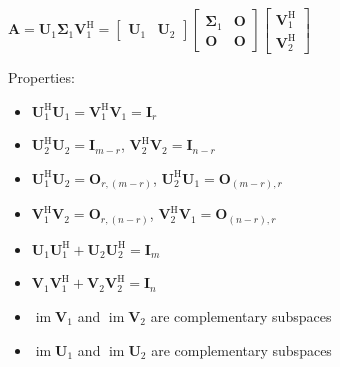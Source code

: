 \documentclass[english]{latex4ei/latex4ei_sheet}
\begin{document}
\begin{sectionbox}
  \begin{emphbox}
    $\boldsymbol{A}=\boldsymbol{U}_{1} \boldsymbol{\Sigma}_{1} \boldsymbol{V}_{1}^{\mathrm{H}}=\left[\begin{array}{ll}
      \boldsymbol{U}_{1} & \boldsymbol{U}_{2}
      \end{array}\right]\left[\begin{array}{cc}
      \boldsymbol{\Sigma}_{1} & \mathbf{O} \\
      \mathbf{O} & \mathbf{O}
      \end{array}\right]\left[\begin{array}{c}
      \boldsymbol{V}_{1}^{\mathrm{H}} \\
      \boldsymbol{V}_{2}^{\mathrm{H}}
      \end{array}\right]$
  \end{emphbox}
  Properties:
  \begin{itemize}
    \item $\boldsymbol{U}_{1}^{\mathrm{H}} \boldsymbol{U}_{1}=\boldsymbol{V}_{1}^{\mathrm{H}} \boldsymbol{V}_{1}=\mathbf{I}_{r}$\\
    \item $\boldsymbol{U}_{2}^{\mathrm{H}} \boldsymbol{U}_{2}=\mathbf{I}_{m-r}$, $\mathbf{V}_{2}^{\mathrm{H}} \mathbf{V}_{2}=\mathbf{I}_{n-r}$\\
    \item $\boldsymbol{U}_{1}^{\mathrm{H}} \boldsymbol{U}_{2}=\mathbf{O}_{r,(m-r)}$, $\boldsymbol{U}_{2}^{\mathrm{H}} \boldsymbol{U}_{1}=\mathbf{O}_{(m-r), r}$\\
    \item $\boldsymbol{V}_{1}^{\mathrm{H}} \boldsymbol{V}_{2}=\mathbf{O}_{r,(n-r)}$, $\boldsymbol{V}_{2}^{\mathrm{H}} \boldsymbol{V}_{1}=\mathbf{O}_{(n-r), r}$\\
    \item $\boldsymbol{U}_{1} \boldsymbol{U}_{1}^{\mathrm{H}}+\boldsymbol{U}_{2} \boldsymbol{U}_{2}^{\mathrm{H}}=\mathbf{I}_{m}$\\
    \item $\boldsymbol{V}_{1} \boldsymbol{V}_{1}^{\mathrm{H}}+\boldsymbol{V}_{2} \boldsymbol{V}_{2}^{\mathrm{H}}=\mathbf{I}_{n}$\\
    \item $\operatorname{im}\boldsymbol{V}_{1}$ and $\operatorname{im}\boldsymbol{V}_{2}$ are complementary subspaces
    \item $\operatorname{im}\boldsymbol{U}_{1}$ and $\operatorname{im}\boldsymbol{U}_{2}$ are complementary subspaces

\end{itemize}
\end{sectionbox}
\end{document}
